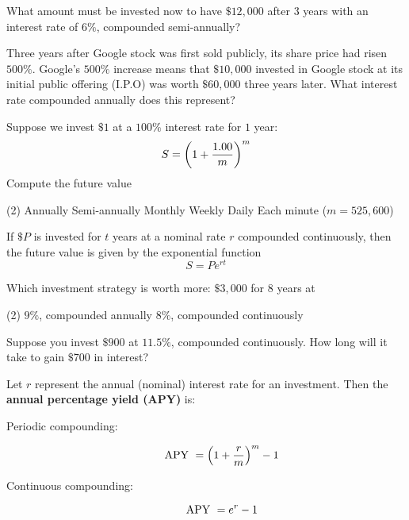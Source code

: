 \documentclass[../mathNotesPreamble]{subfiles}
\begin{document}
  \begin{ex*}
    What amount must be invested now to have $\$12,000$ after $3$ years with an interest rate of $6\%$, compounded semi-annually?
  \end{ex*}

  \begin{ex*}
    Three years after Google stock was first sold publicly, its share price had risen $500\%$. Google’s $500\%$ increase means that $\$10,000$ invested in Google stock at its initial public offering (I.P.O) was worth $\$60,000$ three years later. What interest rate compounded annually does this represent?
  \end{ex*}
  \pagebreak

  \begin{ex*}
    Suppose we invest $\$1$ at a $100\%$ interest rate for $1$ year:
      \[S={\left(1+\frac{1.00}{m}\right)}^m\]
    Compute the future value
  \end{ex*}
  \begin{extasks}[after-item-skip=\stretch{1}](2)
    \task Annually
    \task Semi-annually
    \task Monthly
    \task Weekly
    \task Daily
    \task Each minute ($m=525,600$)
  \end{extasks}
  \pagebreak

  \begin{defn*}
    If $\$P$ is invested for $t$ years at a nominal rate $r$ compounded continuously, then the future value is given by the exponential function
      \[S=Pe^{rt}\]
  \end{defn*}

  \begin{ex*}
    Which investment strategy is worth more: $\$3,000$ for $8$ years at
      \begin{extasks}[after-item-skip=\stretch{1}](2)
        \task $9\%$, compounded annually
        \task $8\%$, compounded continuously
      \end{extasks}
  \end{ex*}

  \begin{ex*}
    Suppose you invest $\$900$ at $11.5\%$, compounded continuously. How long will it take to gain $\$700$ in interest?
  \end{ex*}
  \pagebreak
  \begin{defn*}
    Let $r$ represent the annual (nominal) interest rate for an investment. Then the \textbf{annual percentage yield (APY)} is:
    \begin{description}
      \item[Periodic compounding:]
        \[\textnormal{APY }={\left(1+\frac{r}{m}\right)}^m-1\]
      \item[Continuous compounding:]
        \[\textnormal{APY }=e^r-1\]
    \end{description}
  \end{defn*}

  \pagebreak
\end{document}
